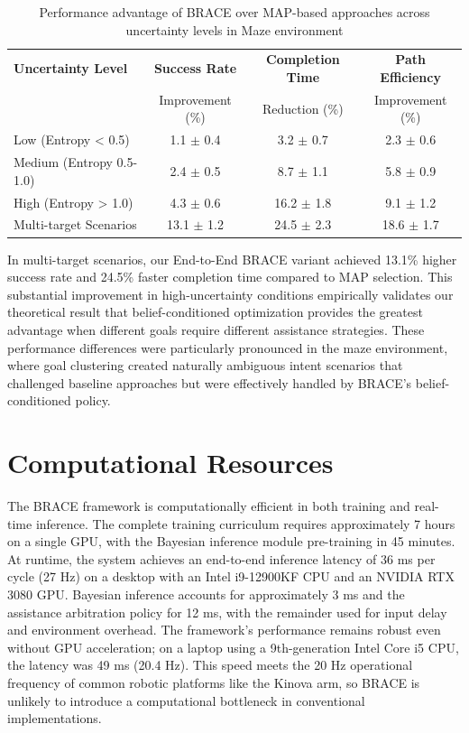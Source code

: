 \documentclass[11pt]{article}
\begin{document}
\begin{table}[h]
\caption{Performance advantage of BRACE over MAP-based approaches across uncertainty levels in Maze environment}
\label{tab:uncertainty_advantage}
\centering
\begin{tabular}{lccc}
\toprule
\textbf{Uncertainty Level} & \textbf{Success Rate} & \textbf{Completion Time} & \textbf{Path Efficiency} \\
 & Improvement (\%) & Reduction (\%) & Improvement (\%) \\
\midrule
Low (Entropy < 0.5) & 1.1 $\pm$ 0.4 & 3.2 $\pm$ 0.7 & 2.3 $\pm$ 0.6 \\
Medium (Entropy 0.5-1.0) & 2.4 $\pm$ 0.5 & 8.7 $\pm$ 1.1 & 5.8 $\pm$ 0.9 \\
High (Entropy > 1.0) & 4.3 $\pm$ 0.6 & 16.2 $\pm$ 1.8 & 9.1 $\pm$ 1.2 \\
Multi-target Scenarios & 13.1 $\pm$ 1.2 & 24.5 $\pm$ 2.3 & 18.6 $\pm$ 1.7 \\
\bottomrule
\end{tabular}
\end{table}

In multi-target scenarios, our End-to-End BRACE variant achieved 13.1\% higher success rate and 24.5\% faster completion time compared to MAP selection. This substantial improvement in high-uncertainty conditions empirically validates our theoretical result that belief-conditioned optimization provides the greatest advantage when different goals require different assistance strategies. These performance differences were particularly pronounced in the maze environment, where goal clustering created naturally ambiguous intent scenarios that challenged baseline approaches but were effectively handled by BRACE's belief-conditioned policy.




\section{Computational Resources}

The BRACE framework is computationally efficient in both training and real-time inference. The complete training curriculum requires approximately 7 hours on a single GPU, with the Bayesian inference module pre-training in 45 minutes. At runtime, the system achieves an end-to-end inference latency of 36 ms per cycle (27 Hz) on a desktop with an Intel i9-12900KF CPU and an NVIDIA RTX 3080 GPU. Bayesian inference accounts for approximately 3 ms and the assistance arbitration policy for 12 ms, with the remainder used for input delay and environment overhead. The framework's performance remains robust even without GPU acceleration; on a laptop using a 9th-generation Intel Core i5 CPU, the latency was 49 ms (20.4 Hz). This speed meets the 20 Hz operational frequency of common robotic platforms like the Kinova arm, so BRACE is unlikely to introduce a computational bottleneck in conventional implementations.
\end{document}
